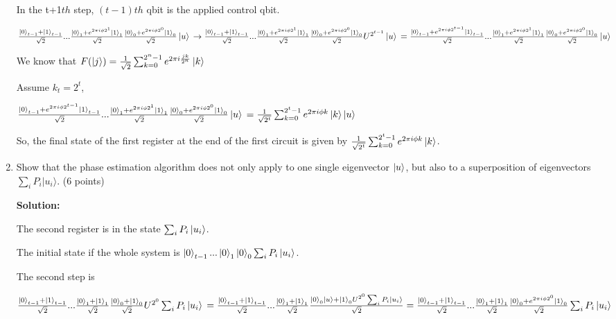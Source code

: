 \documentclass[12pt]{article}
\begin{document}
\begin{enumerate}
          In the t+1$th$ step, $(t-1)th$ qbit is the applied control qbit.

          $
              \frac{\ket{0}_{t-1}+\ket{1}_{t-1}}{\sqrt{2}}...\frac{\ket{0}_{1}+e^{2\pi i\phi 2^1}\ket{1}_{1}}{\sqrt{2}}\frac{\ket{0}_{0}+e^{2\pi i\phi 2^0}\ket{1}_{0}}{\sqrt{2}}\ket{u}
              \\\rightarrow
              \frac{\ket{0}_{t-1}+\ket{1}_{t-1}}{\sqrt{2}}...\frac{\ket{0}_{1}+e^{2\pi i\phi 2^1}\ket{1}_{1}}{\sqrt{2}}\frac{\ket{0}_{0}+e^{2\pi i\phi 2^0}\ket{1}_{0}}{\sqrt{2}}U^{2^{t-1}}\ket{u}
              \\=\frac{\ket{0}_{t-1}+e^{2\pi i\phi 2^{t-1}}\ket{1}_{t-1}}{\sqrt{2}}...\frac{\ket{0}_{1}+e^{2\pi i\phi 2^1}\ket{1}_{1}}{\sqrt{2}}\frac{\ket{0}_{0}+e^{2\pi i\phi 2^0}\ket{1}_{0}}{\sqrt{2}}\ket{u}
          $




          We know that $F(\ket{j})=\frac{1}{\sqrt{2}}\sum_{k=0}^{2^n-1}e^{2\pi i \frac{jk}{2^n}}\ket{k}$


          Assume $k_t=2^t$,

          $\frac{\ket{0}_{t-1}+e^{2\pi i\phi 2^{t-1}}\ket{1}_{t-1}}{\sqrt{2}}...\frac{\ket{0}_{1}+e^{2\pi i\phi 2^1}\ket{1}_{1}}{\sqrt{2}}\frac{\ket{0}_{0}+e^{2\pi i\phi 2^0}\ket{1}_{0}}{\sqrt{2}}\ket{u}
              \\=\frac{1}{\sqrt{2^t}}\sum_{k=0}^{2^t-1} e^{2\pi i\phi k}\ket{k}\ket{u}$

          So, the final state of the first register at the end of the first circuit is given by
          $\frac{1}{\sqrt{2^t}}\sum_{k=0}^{2^t-1} e^{2\pi i\phi k}\ket{k}$.


    \item Show that the phase estimation algorithm does not only apply to one single eigenvector $\ket{u}$, but also to a superposition of eigenvectors $\sum_i P_i |u_i\rangle$. (6 points)

    \textbf{Solution:}


    The second register is in the state $\sum_i P_i \ket{u_i}$.

    The initial state if the whole system is $\ket{0}_{t-1}...\ket{0}_1\ket{0}_{0}\sum_i P_i \ket{u_i}$.

    The second step is 

    $
    \frac{\ket{0}_{t-1}+\ket{1}_{t-1}}{\sqrt{2}}...\frac{\ket{0}_1+\ket{1}_1}{\sqrt{2}}\frac{\ket{0}_{0}+\ket{1}_{0}}{\sqrt{2}}U^{2^0}\sum_i P_i \ket{u_i}
    \\=\frac{\ket{0}_{t-1}+\ket{1}_{t-1}}{\sqrt{2}}...\frac{\ket{0}_1+\ket{1}_1}{\sqrt{2}}\frac{\ket{0}_{0}\ket{u}+\ket{1}_{0}U^{2^0}\sum_i P_i \ket{u_i}}{\sqrt{2}}
    \\=\frac{\ket{0}_{t-1}+\ket{1}_{t-1}}{\sqrt{2}}...\frac{\ket{0}_1+\ket{1}_1}{\sqrt{2}}\frac{\ket{0}_{0}+e^{2\pi i\phi 2^0}\ket{1}_{0}}{\sqrt{2}}\sum_i P_i \ket{u_i}
$



\end{enumerate}
\end{document}
